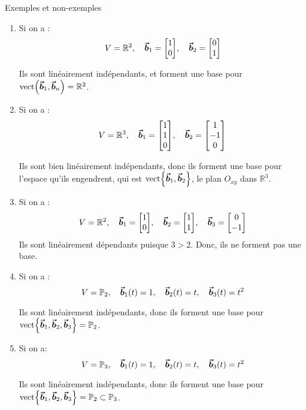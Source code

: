 \documentclass[a4paper]{article}
\begin{document}
\begin{parag}{Exemples et non-exemples}
    \begin{enumerate}[left=0pt]
        \item Si on a :
        \[V = \mathbb{R}^2, \mathspace \bvec{b}_1 = \begin{bmatrix} 1 \\ 0 \end{bmatrix}, \mathspace \bvec{b}_2 = \begin{bmatrix} 0 \\ 1 \end{bmatrix} \]

        Ils sont linéairement indépendants, et forment une base pour $\vect\left(\bvec{b}_1, \bvec{b}_n\right) = \mathbb{R}^2$.
        \item Si on a :
        \[V = \mathbb{R}^3, \mathspace \bvec{b}_1 = \begin{bmatrix} 1 \\ 1 \\ 0 \end{bmatrix}, \mathspace \bvec{b}_2 = \begin{bmatrix} 1 \\ -1 \\ 0 \end{bmatrix} \]

        Ils sont bien linéairement indépendants, donc ils forment une base pour l'espace qu'ils engendrent, qui est $\vect\left\{\bvec{b}_1, \bvec{b}_2\right\}$, le plan $O_{xy}$ dans $\mathbb{R}^3$.
        \item Si on a :
        \[V = \mathbb{R}^2, \mathspace \bvec{b}_1 = \begin{bmatrix} 1 \\ 0 \end{bmatrix}, \mathspace \bvec{b}_2 = \begin{bmatrix} 1 \\ 1 \end{bmatrix}, \mathspace \bvec{b}_3 = \begin{bmatrix} 0 \\ -1 \end{bmatrix} \]
        Ils sont linéairement dépendants puisque $3 > 2$. Donc, ils ne forment pas une base.
        \item Si on a :
        \[V = \mathbb{P}_2, \mathspace \bvec{b}_1\left(t\right) = 1, \mathspace \bvec{b}_2\left(t\right) = t, \mathspace \bvec{b}_3\left(t\right) = t^2\]

        Ils sont linéairement indépendants, donc ils forment une base pour $\vect\left\{\bvec{b}_1, \bvec{b}_2, \bvec{b}_3\right\} = \mathbb{P}_2$.
        \item Si on a:
        \[V = \mathbb{P}_3, \mathspace \bvec{b}_1\left(t\right) = 1, \mathspace \bvec{b}_2\left(t\right) = t, \mathspace \bvec{b}_3\left(t\right) = t^2\]

        Ils sont linéairement indépendants, donc ils forment une base pour $\vect\left\{\bvec{b}_1, \bvec{b}_2, \bvec{b}_3\right\} = \mathbb{P}_2 \subset \mathbb{P}_3$.


    \end{enumerate}

\end{parag}
\end{document}
